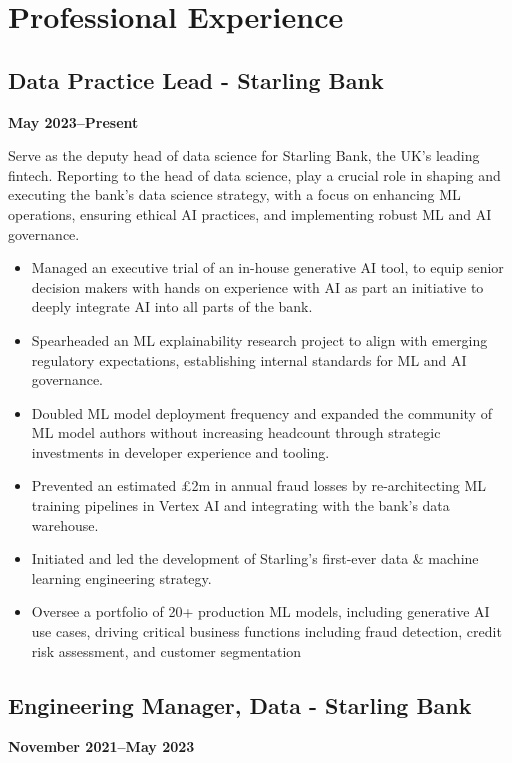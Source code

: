 \documentclass[a4paper]{scrartcl}
\begin{document}
\section*{Professional Experience}

\subsection*{Data Practice Lead - Starling Bank}
\textbf{May 2023--Present}

Serve as the deputy head of data science for Starling Bank, the UK's leading fintech. Reporting to the head of data science, play a crucial role in shaping and executing the bank's data science strategy, with a focus on enhancing ML operations, ensuring ethical AI practices, and implementing robust ML and AI governance.
\begin{itemize}
	\item Managed an executive trial of an in-house generative AI tool, to equip senior decision makers with hands on experience with AI as part an initiative to deeply integrate AI into all parts of the bank.
	\item Spearheaded an ML explainability research project to align with emerging regulatory expectations, establishing internal standards for ML and AI governance.
	\item Doubled ML model deployment frequency and expanded the community of ML model authors without increasing headcount through strategic investments in developer experience and tooling.
	\item Prevented an estimated £2m in annual fraud losses by re-architecting ML training pipelines in Vertex AI and integrating with the bank's data warehouse.
	\item Initiated and led the development of Starling's first-ever data \& machine learning engineering strategy.
	\item Oversee a portfolio of 20+ production ML models, including generative AI use cases, driving critical business functions including fraud detection, credit risk assessment, and customer segmentation
\end{itemize}

\subsection*{Engineering Manager, Data - Starling Bank}
\textbf{November 2021--May 2023}
\end{document}

